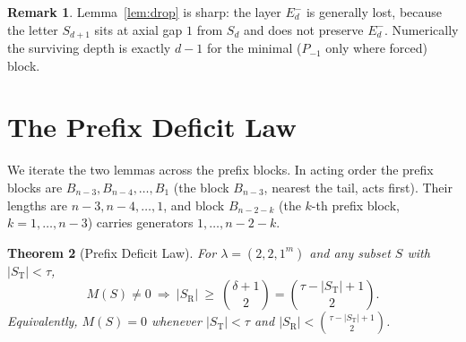\documentclass[11pt]{article}
\newtheorem{theorem}{Theorem}
\theoremstyle{definition}
\newtheorem{remark}[theorem]{Remark}
\newcommand{\Em}[1]{E^{-}_{#1}}
\newcommand{\Pm}{P_{-1}}
\newcommand{\St}{S_{\mathrm T}}
\newcommand{\Sr}{S_{\mathrm R}}
\begin{document}
\begin{remark}
Lemma~\ref{lem:drop} is sharp: the layer $\Em d$ is generally lost, because the letter $S_{d+1}$
sits at axial gap $1$ from $S_d$ and does not preserve $\Em d$. Numerically the surviving depth
is exactly $d-1$ for the minimal ($\Pm$ only where forced) block.
\end{remark}

\section{The Prefix Deficit Law}\label{sec:main}

We iterate the two lemmas across the prefix blocks. In acting order the prefix blocks are
$B_{n-3},B_{n-4},\dots,B_1$ (the block $B_{n-3}$, nearest the tail, acts first). Their lengths
are $n-3,n-4,\dots,1$, and block $B_{n-2-k}$ (the $k$-th prefix block, $k=1,\dots,n-3$) carries
generators $1,\dots,n-2-k$.

\begin{theorem}[Prefix Deficit Law]\label{thm:main}
For $\lambda=(2,2,1^m)$ and any subset $S$ with $|\St|<\tau$,
\[
   M(S)\neq0\ \Longrightarrow\ |\Sr|\ \ge\ \binom{\delta+1}{2}=\binom{\tau-|\St|+1}{2}.
\]
Equivalently, $M(S)=0$ whenever $|\St|<\tau$ and
$|\Sr|<\binom{\tau-|\St|+1}{2}$.
\end{theorem}
\end{document}
